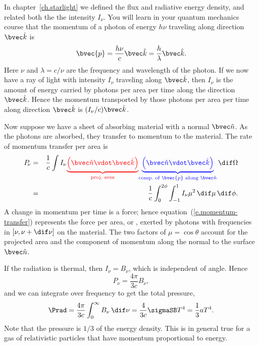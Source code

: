 \begin{sidebar}
\label{sb.radiation-pressure}
In chapter~\ref{ch.starlight} we defined the flux and radiative energy density, and related both the the intensity $I_{\nu}$. You will learn in your quantum mechanics course that the momentum of a photon of energy $h\nu$ traveling along direction $\unitk$ is
\[ \bvec{p} = \frac{h\nu}{c}\unitk = \frac{h}{\lambda}\unitk. \]
Here $\nu$ and $\lambda = c/\nu$ are the frequency and wavelength of the photon. If we now have a ray of light with intensity $I_{\nu}$ traveling along $\unitk$, then $I_{\nu}$ is the amount of energy carried by photons per area per time along the direction $\unitk$. Hence the momentum transported by those photons per area per time along direction $\unitk$ is $(I_{\nu}/c)\unitk$.

Now suppose we have a sheet of absorbing material with a normal $\unitn$. As the photons are absorbed, they transfer to momentum to the material. The rate of momentum transfer per area is
\begin{eqnarray}
P_{\!\nu} &=& \frac{1}{c}\int I_{\nu}
	{\color{red}\underbrace{\left(\unitn\vdot\unitk\right)}_{\textrm{proj.~area}}}
	{\color{blue}\underbrace{\left(\unitn\vdot\unitk\right)}_{\textrm{comp.\ of $\bvec{p}$ along $\unitn$}}}
	\,\dif\Omega \nonumber\\
	&=& \frac{1}{c}\int_{0}^{2\phi}\int_{-1}^{1}I_{\nu} \mu^{2}\,\dif \mu\,\dif\phi.
\label{e.momentum-transfer}
\end{eqnarray}
A change in momentum per time is a force; hence equation~(\ref{e.momentum-transfer}) represents the force per area, or , exerted by photons with frequencies in $[\nu,\nu+\dif\nu]$ on the material. The two factors of $\mu=\cos\theta$ account for the projected area and the component of momentum along the normal to the surface $\unitn$.

If the radiation is thermal, then $I_{\nu} = B_{\nu}$, which is independent of angle. Hence
\[
	P_{\!\nu} = \frac{4\pi}{3c}B_{\nu},
\]
and we can integrate over frequency to get the total pressure,
\begin{equation}\label{e.radiation-pressure}
	\Prad = \frac{4\pi}{3c}\int_{0}^{\infty}B_{\nu}\,\dif\nu = \frac{4}{3c}\sigmaSB T^{4} = \frac{1}{3}aT^{4}.
\end{equation}
Note that the pressure is $1/3$ of the energy density. This is in general true for a gas of relativistic particles that have momentum proportional to energy.
\end{sidebar}

